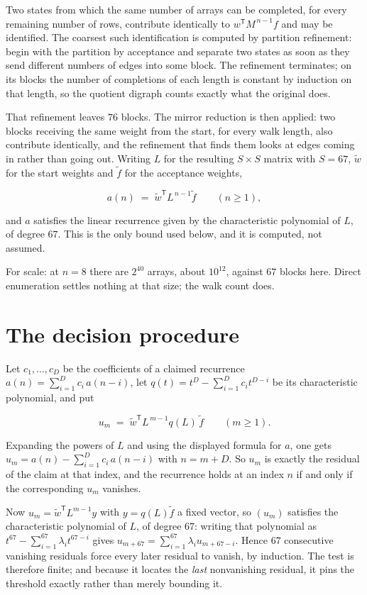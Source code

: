 \documentclass[11pt]{article}
\theoremstyle{definition}
\begin{document}
Two states from which the same number of arrays can be completed, for every remaining number of rows, contribute identically to $w^{\mathsf T}M^{\,n-1}f$ and may be identified. The coarsest such identification is computed by partition refinement: begin with the partition by acceptance and separate two states as soon as they send different numbers of edges into some block. The refinement terminates; on its blocks the number of completions of each length is constant by induction on that length, so the quotient digraph counts exactly what the original does.

That refinement leaves $76$ blocks. The mirror reduction is then applied: two blocks receiving the same weight from the start, for every walk length, also contribute identically, and the refinement that finds them looks at edges coming in rather than going out. Writing $L$ for the resulting $S \times S$ matrix with $S = 67$, $\tilde w$ for the start weights and $\tilde f$ for the acceptance weights,

\[a(n) \;=\; \tilde w^{\mathsf T} L^{\,n-1} \tilde f \qquad (n \ge 1),\]

and $a$ satisfies the linear recurrence given by the characteristic polynomial of $L$, of degree $67$. This is the only bound used below, and it is computed, not assumed.

For scale: at $n = 8$ there are $2^{40}$ arrays, about $10^{12}$, against $67$ blocks here. Direct enumeration settles nothing at that size; the walk count does.

\section{The decision procedure}

Let $c_1,\dots,c_D$ be the coefficients of a claimed recurrence $a(n) = \sum_{i=1}^{D} c_i\,a(n-i)$, let $q(t) = t^{D} - \sum_{i=1}^{D} c_i t^{D-i}$ be its characteristic polynomial, and put

\[u_m \;=\; \tilde w^{\mathsf T} L^{\,m-1} q(L)\,\tilde f \qquad (m \ge 1).\]

Expanding the powers of $L$ and using the displayed formula for $a$, one gets $u_m = a(n) - \sum_{i=1}^{D} c_i\,a(n-i)$ with $n = m + D$. So $u_m$ is exactly the residual of the claim at that index, and the recurrence holds at an index $n$ if and only if the corresponding $u_m$ vanishes.

Now $u_m = \tilde w^{\mathsf T} L^{m-1} y$ with $y = q(L)\tilde f$ a fixed vector, so $(u_m)$ satisfies the characteristic polynomial of $L$, of degree $67$: writing that polynomial as $t^{67} - \sum_{i=1}^{67} \lambda_i t^{67-i}$ gives $u_{m+67} = \sum_{i=1}^{67} \lambda_i u_{m+67-i}$. Hence $67$ consecutive vanishing residuals force every later residual to vanish, by induction. The test is therefore finite; and because it locates the {\itshape last} nonvanishing residual, it pins the threshold exactly rather than merely bounding it.
\end{document}
